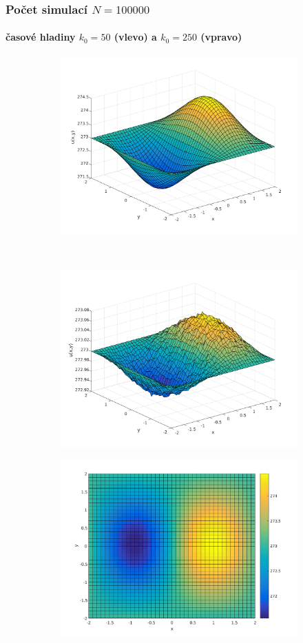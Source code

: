 \begin{frame}\frametitle{Počet simulací $N=100000$}
\framesubtitle{časové hladiny $k_{0}=50$ (vlevo) a $k_{0}=250$ (vpravo)}
\begin{figure}
    \centering
    \begin{subfigure}[t]{0.5\textwidth}
        \centering
        \includegraphics[width=0.775\linewidth]{../../results/simulations/100000/solution_3D/solution_3D_sim100000_step01_time50_boundary2.pdf}
    \end{subfigure}%
    ~ 
    \begin{subfigure}[t]{0.5\textwidth}
        \centering
        \includegraphics[width=0.775\linewidth]{../../results/simulations/100000/solution_3D/solution_3D_sim100000_step01_time250_boundary2.pdf}
    \end{subfigure}
    \begin{subfigure}[t]{0.5\textwidth}
        \centering
        \includegraphics[width=0.75\linewidth]{../../results/simulations/100000/solution_2D/solution_2D_sim100000_step01_time50_boundary2.pdf}

\end{subfigure}
\end{figure}
\end{frame}
